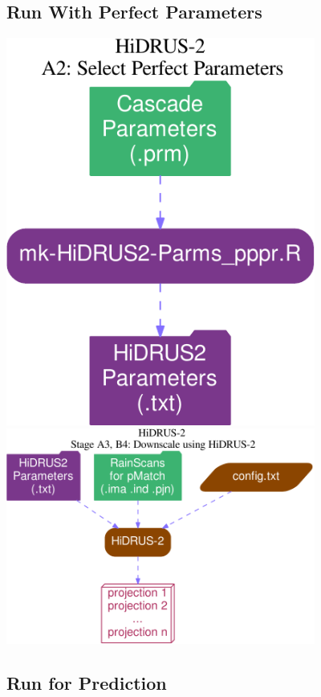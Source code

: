 \documentclass[12pt, a4paper]{extarticle}
\begin{document}
\subsection{Run With Perfect Parameters}
\includegraphics[width=4in]{./fig/perf_prm.pdf}\\
\includegraphics[width=4in]{./fig/runPerf_h2.pdf}

\subsection{Run for Prediction}
\end{document}
